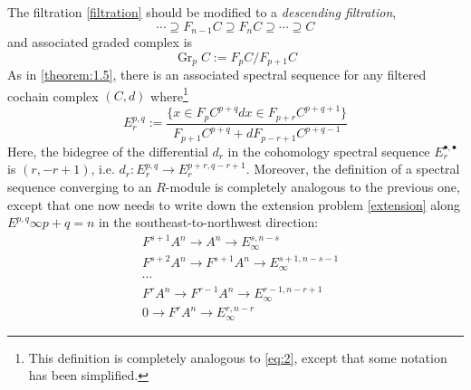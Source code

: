 \documentclass[a4paper,11pt]{article}
\theoremstyle{definition}
\theoremstyle{remark}
\begin{document}
The filtration \eqref{filtration} should be modified to a {\itshape descending filtration},
\begin{equation}
	\cdots \supseteq F_{n-1}C\supseteq F_nC\supseteq \cdots \supseteq C
\end{equation}
and associated graded complex is
\[
\operatorname{Gr}_pC:=F_pC/F_{p+1}C
\]
As in \cref{theorem:1.5}, there is an associated spectral sequence for any filtered cochain complex $(C,d)$ where\footnote{This definition is completely analogous to \eqref{eq:2}, except that some notation has been simplified.}
\[
E^{p,q}_r:=\frac{\{x\in F_pC^{p+q}dx\in F_{p+r}C^{p+q+1}\}}{F_{p+1}C^{p+q}+dF_{p-r+1}C^{p+q-1}}
\]
Here, the bidegree of the differential $d_r$ in the cohomology spectral sequence $E_r^{\bullet,\bullet}$ is $(r,-r+1)$, i.e. $d_r:E_r^{p,q}\to E_r^{p+r,q-r+1}$. Moreover, the definition of a spectral sequence converging to an $R$-module is completely analogous to the previous one, except that one now needs to write down the extension problem \eqref{extension} along ${E^{p,q}{\infty}}{p+q=n}$ in the southeast-to-northwest direction:
\begin{equation}
\label{extension_co}
\begin{aligned}
	&F^{s+1}A^n \to A^n \to E_\infty^{s,n-s}\\
	&F^{s+2}A^n \to F^{s+1}A^n \to E_{\infty}^{s+1,n-s-1}\\
	&\cdots\\
	&F^{r}A^n \to F^{r-1}A^n \to E_\infty^{r-1,n-r+1}\\
	&0 \to F^{r}A^n \to E_{\infty}^{r,n-r}
\end{aligned}
\end{equation}
\end{document}
